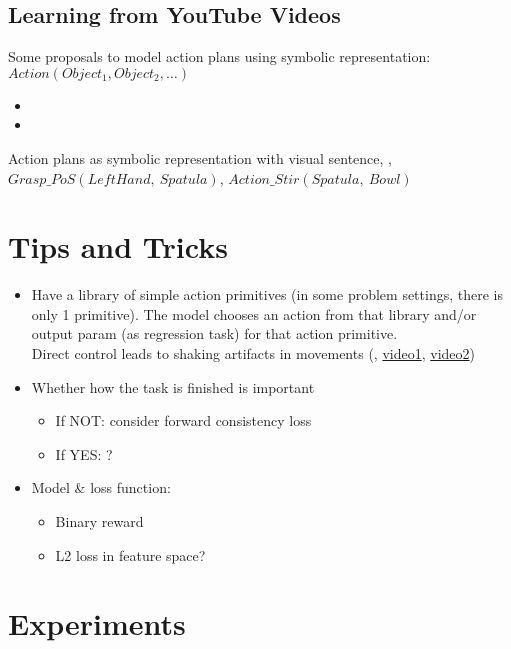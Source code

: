 \subsection{Learning from YouTube Videos}
Some proposals to model action plans using symbolic representation: $ Action(Object_1, Object_2, \dots) $
\begin{itemize}
	\item {}
	\item {}
\end{itemize}
Action plans as symbolic representation  with visual sentence, \eg, $Grasp\_PoS(LeftHand,\ Spatula)$, $Action\_Stir(Spatula,\ Bowl)$

\section{Tips and Tricks}
\begin{itemize}
	\item Have a library of simple action primitives (in some problem settings, there is only 1 primitive). The model chooses an action from that library and/or output \ac{param} (as regression task) for that action primitive. \cite{pathak2018zero}\\
	Direct control leads to shaking artifacts in movements (\eg, \href{http://rll.berkeley.edu/dsae}{video1}, \href{https://sites.google.com/site/visualrlwithimaginedgoals}{video2}) \cite{nair2018visual}
	\item Whether how the task is finished is important
	\begin{itemize}
		\item If NOT: consider forward consistency loss \cite{pathak2018zero}
		\item If YES: ?
	\end{itemize}
	\item Model \& loss function:
	\begin{itemize}
		\item Binary reward \cite{andrychowicz2017hindsight}
		\item L2 loss in feature space? \cite{nair2018visual, pathak2018zero}
	\end{itemize}
\end{itemize}

\section{Experiments}

